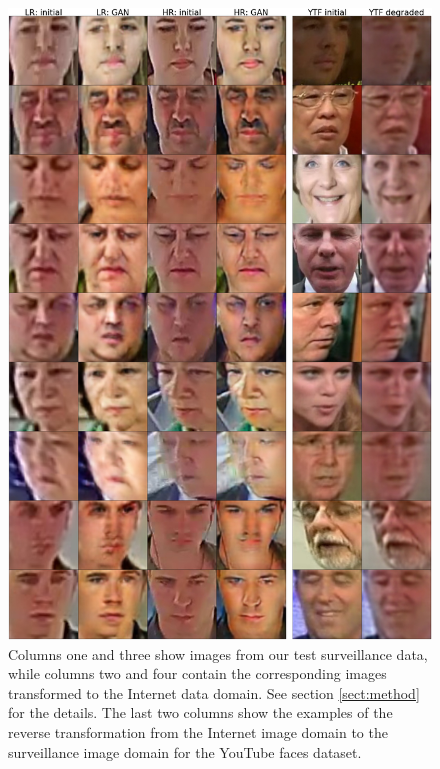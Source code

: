   
%
    \begin{figure}
    \includegraphics[width=\linewidth]{Chapters/face/Fig2.jpg}
    \caption{Columns one and three show images from our test surveillance data, while columns two and four contain the corresponding images transformed to the Internet data domain. See section \ref{sect:method} for the details. The last two columns show the examples of the reverse transformation from the Internet image domain to the surveillance image domain for the YouTube faces dataset.  }\label{fig:lr_hr_gan_res_ytube_initial_degraded}
  \end{figure}
  
  



 


